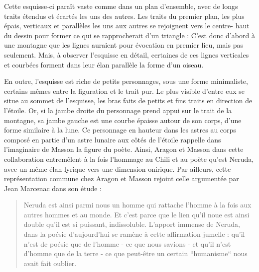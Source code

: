 	Cette esquisse-ci paraît vaste comme dans un plan d’ensemble, avec de longs traits étendus et écartés les uns des autres. Les traits du premier plan, les plus épais, verticaux et parallèles les uns aux autres se rejoignent vers le centre- haut du dessin pour former ce qui se rapprocherait d’un triangle : C’est donc d’abord à une montagne que les lignes auraient pour évocation en premier lieu, mais pas seulement. Mais, à observer l’esquisse en détail, certaines de ces lignes verticales et courbées forment dans leur élan parallèle la forme d’un oiseau. 


En outre, l’esquisse est riche de petits personnages, sous une forme minimaliste, certains mêmes entre la figuration et le trait pur. Le plus visible d’entre eux se situe au sommet de l’esquisse, les bras faits de petits et fins traits en direction de l’étoile. Or, si la jambe droite du personnage prend appui sur le trait de la montagne, sa jambe gauche est une courbe épaisse autour de son corps, d’une forme similaire à la lune. Ce personnage en hauteur dans les astres au corps composé en partie d’un astre lunaire aux côtés de l’étoile rappelle dans l’imaginaire de Masson la figure du poète. Ainsi, Aragon et Masson dans cette collaboration entremêlent à la fois l’hommage au Chili et au poète qu’est Neruda, avec un même élan lyrique vers une dimension onirique. Par ailleurs, cette représentation commune chez Aragon et Masson rejoint celle argumentée par Jean Marcenac dans son étude :

\begin{quote}
Neruda est ainsi parmi nous un homme qui rattache l’homme à la fois aux autres hommes et au monde. Et c’est parce que le lien qu’il noue est ainsi double qu’il est si puissant, indissoluble. L’apport immense de Neruda, dans la poésie d’aujourd’hui se ramène à cette affirmation jumelle : qu’il n’est de poésie que de l’homme - ce que nous savions - et qu’il n’est d’homme que de la terre - ce que peut-être un certain “humanisme“ nous avait fait oublier.	
\end{quote}

